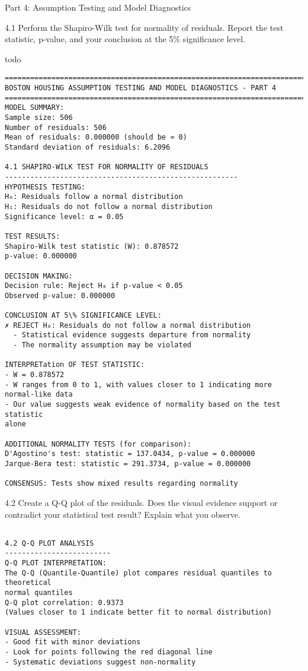 \documentclass[11pt, twocolumn]{article}
\begin{document}
    Part 4: Assumption Testing and Model Diagnostics

    4.1 Perform the Shapiro-Wilk test for normality of residuals. Report the
test statistic, p-value, and your conclusion at the 5\% significance
level.

todo

    \begin{Verbatim}[commandchars=\\\{\}]
================================================================================
BOSTON HOUSING ASSUMPTION TESTING AND MODEL DIAGNOSTICS - PART 4
================================================================================
MODEL SUMMARY:
Sample size: 506
Number of residuals: 506
Mean of residuals: 0.000000 (should be ≈ 0)
Standard deviation of residuals: 6.2096

4.1 SHAPIRO-WILK TEST FOR NORMALITY OF RESIDUALS
-------------------------------------------------------
HYPOTHESIS TESTING:
H₀: Residuals follow a normal distribution
H₁: Residuals do not follow a normal distribution
Significance level: α = 0.05

TEST RESULTS:
Shapiro-Wilk test statistic (W): 0.878572
p-value: 0.000000

DECISION MAKING:
Decision rule: Reject H₀ if p-value < 0.05
Observed p-value: 0.000000

CONCLUSION AT 5\% SIGNIFICANCE LEVEL:
✗ REJECT H₀: Residuals do not follow a normal distribution
  - Statistical evidence suggests departure from normality
  - The normality assumption may be violated

INTERPRETation OF TEST STATISTIC:
- W = 0.878572
- W ranges from 0 to 1, with values closer to 1 indicating more normal-like data
- Our value suggests weak evidence of normality based on the test statistic
alone

ADDITIONAL NORMALITY TESTS (for comparison):
D'Agostino's test: statistic = 137.0434, p-value = 0.000000
Jarque-Bera test: statistic = 291.3734, p-value = 0.000000

CONSENSUS: Tests show mixed results regarding normality
    \end{Verbatim}

    4.2 Create a Q-Q plot of the residuals. Does the visual evidence support
or contradict your statistical test result? Explain what you observe.

    \begin{Verbatim}[commandchars=\\\{\}]

4.2 Q-Q PLOT ANALYSIS
-------------------------
Q-Q PLOT INTERPRETATION:
The Q-Q (Quantile-Quantile) plot compares residual quantiles to theoretical
normal quantiles
Q-Q plot correlation: 0.9373
(Values closer to 1 indicate better fit to normal distribution)

VISUAL ASSESSMENT:
- Good fit with minor deviations
- Look for points following the red diagonal line
- Systematic deviations suggest non-normality
    \end{Verbatim}
\end{document}
